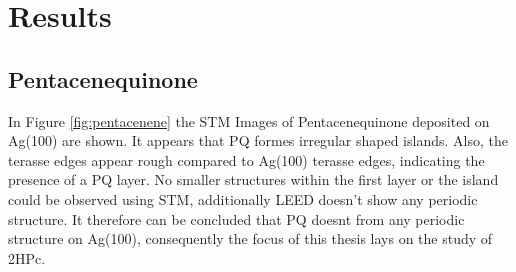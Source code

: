\chapter{Results}
\section{Pentacenequinone}
In Figure \ref{fig:pentacenene} the STM Images of Pentacenequinone deposited on Ag(100) are shown.
It appears that PQ formes irregular shaped islands.
Also, the terasse edges appear  rough compared to Ag(100) terasse edges, indicating the presence of a PQ layer.
No smaller structures within the first layer or the island could be observed using STM, additionally LEED doesn't show any periodic structure.
It therefore can be concluded that PQ doesnt from any periodic structure on Ag(100), consequently the focus of this thesis lays on the study of 2HPc.

\newpage

